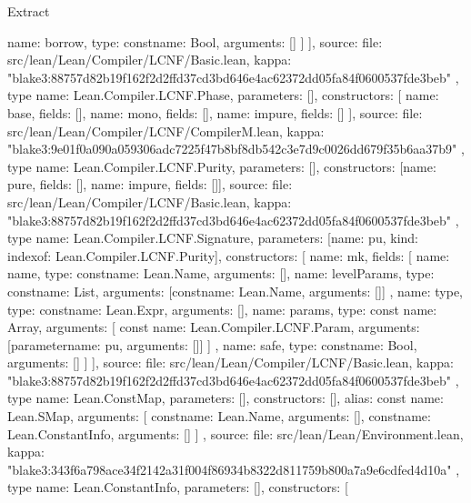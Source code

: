 \begin{lexlean}{Extract}
\begin{toolingmodule}
{{{            {name: borrow, type: const{name: Bool, arguments: []}}
          ]
        }
      ],
      source: {
        file: src/lean/Lean/Compiler/LCNF/Basic.lean,
        kappa: "blake3:88757d82b19f162f2d2ffd37cd3bd646e4ac62372dd05fa84f0600537fde3beb"
      }
    },
    type{
      name: Lean.Compiler.LCNF.Phase,
      parameters: [],
      constructors: [
        {name: base, fields: []},
        {name: mono, fields: []},
        {name: impure, fields: []}
      ],
      source: {
        file: src/lean/Lean/Compiler/LCNF/CompilerM.lean,
        kappa: "blake3:9e01f0a090a059306adc7225f47b8bf8db542c3e7d9c0026dd679f35b6aa37b9"
      }
    },
    type{
      name: Lean.Compiler.LCNF.Purity,
      parameters: [],
      constructors: [{name: pure, fields: []}, {name: impure, fields: []}],
      source: {
        file: src/lean/Lean/Compiler/LCNF/Basic.lean,
        kappa: "blake3:88757d82b19f162f2d2ffd37cd3bd646e4ac62372dd05fa84f0600537fde3beb"
      }
    },
    type{
      name: Lean.Compiler.LCNF.Signature,
      parameters: [{name: pu, kind: index{of: Lean.Compiler.LCNF.Purity}}],
      constructors: [
        {
          name: mk,
          fields: [
            {name: name, type: const{name: Lean.Name, arguments: []}},
            {
              name: levelParams,
              type: const{name: List, arguments: [const{name: Lean.Name, arguments: []}]}
            },
            {name: type, type: const{name: Lean.Expr, arguments: []}},
            {
              name: params,
              type: const{
                name: Array,
                arguments: [
                  const{
                    name: Lean.Compiler.LCNF.Param,
                    arguments: [parameter{name: pu, arguments: []}]
                  }
                ]
              }
            },
            {name: safe, type: const{name: Bool, arguments: []}}
          ]
        }
      ],
      source: {
        file: src/lean/Lean/Compiler/LCNF/Basic.lean,
        kappa: "blake3:88757d82b19f162f2d2ffd37cd3bd646e4ac62372dd05fa84f0600537fde3beb"
      }
    },
    type{
      name: Lean.ConstMap,
      parameters: [],
      constructors: [],
      alias: const{
        name: Lean.SMap,
        arguments: [
          const{name: Lean.Name, arguments: []},
          const{name: Lean.ConstantInfo, arguments: []}
        ]
      },
      source: {
        file: src/lean/Lean/Environment.lean,
        kappa: "blake3:343f6a798ace34f2142a31f004f86934b8322d811759b800a7a9e6cdfed4d10a"
      }
    },
    type{
      name: Lean.ConstantInfo,
      parameters: [],
      constructors: [
}}
\end{toolingmodule}
\end{lexlean}
